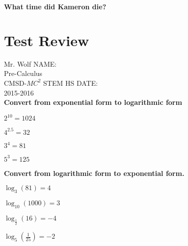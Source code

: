 \documentclass[12pt]{article}
\begin{document}
\vfill

\textbf{What time did  Kameron die?}


\section{Test Review}

\vspace{12pt}

Mr. Wolf \hfill NAME:\underline{\hspace{3in}}\\ 
Pre-Calculus \\ 
CMSD-$MC^2$ STEM HS \hfill DATE:\underline{\hspace{2in}}\\
2015-2016\\

\textbf{Convert from exponential form to logarithmic form}\\

\begin{enumerate}
\begin{multicols}{2}
	\setlength\itemsep{2cm}
	
	\item $2^{10}=1024$\\
	
	\item $4^{2.5}=32$\\
	
	\item $3^4=81$\\
	
	\item $5^3=125$\\

\end{multicols}
\end{enumerate}

\textbf{Convert from logarithmic form to exponential form.}\\

\begin{enumerate}[resume]
\begin{multicols}{2}
	\setlength\itemsep{2cm}
	
	\item $\log_{3}(81)=4$\\
	
	\item $\log_{10}(1000)=3$\\
	
	\item $\log_{\frac{1}{2}}(16)=-4$\\
	
	\item $\log_{5}(\frac{1}{25})=-2$\\

\end{multicols}
\end{enumerate}
\end{document}
